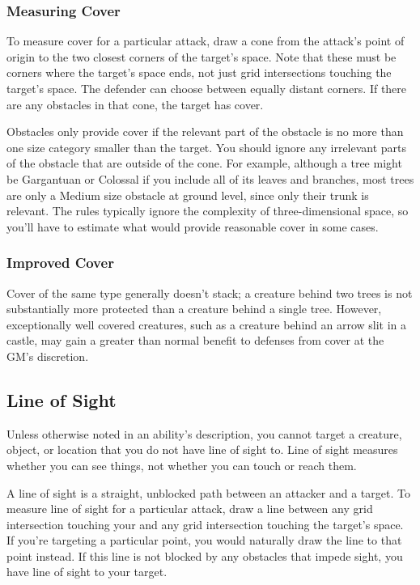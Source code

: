         \subsubsection{Measuring Cover}
            To measure cover for a particular attack, draw a cone from the attack's point of origin to the two closest corners of the target's space.
            Note that these must be corners where the target's space ends, not just grid intersections touching the target's space.
            The defender can choose between equally distant corners.
            If there are any obstacles in that cone, the target has cover.

            Obstacles only provide cover if the relevant part of the obstacle is no more than one size category smaller than the target.
            You should ignore any irrelevant parts of the obstacle that are outside of the cone.
            For example, although a tree might be Gargantuan or Colossal if you include all of its leaves and branches, most trees are only a Medium size obstacle at ground level, since only their trunk is relevant.
            The rules typically ignore the complexity of three-dimensional space, so you'll have to estimate what would provide reasonable cover in some cases.

            \subsubsection{Improved Cover}
            Cover of the same type generally doesn't stack; a creature behind two trees is not substantially more protected than a creature behind a single tree.
            However, exceptionally well covered creatures, such as a creature behind an arrow slit in a castle, may gain a greater than normal benefit to defenses from cover at the GM's discretion.

    \subsection{Line of Sight}\label{Line of Sight}
        Unless otherwise noted in an ability's description, you cannot target a creature, object, or location that you do not have line of sight to.
        Line of sight measures whether you can see things, not whether you can touch or reach them.

        A line of sight is a straight, unblocked path between an attacker and a target.
        To measure line of sight for a particular attack, draw a line between any grid intersection touching your  and any grid intersection touching the target's space.
        If you're targeting a particular point, you would naturally draw the line to that point instead.
        If this line is not blocked by any obstacles that impede sight, you have line of sight to your target.

